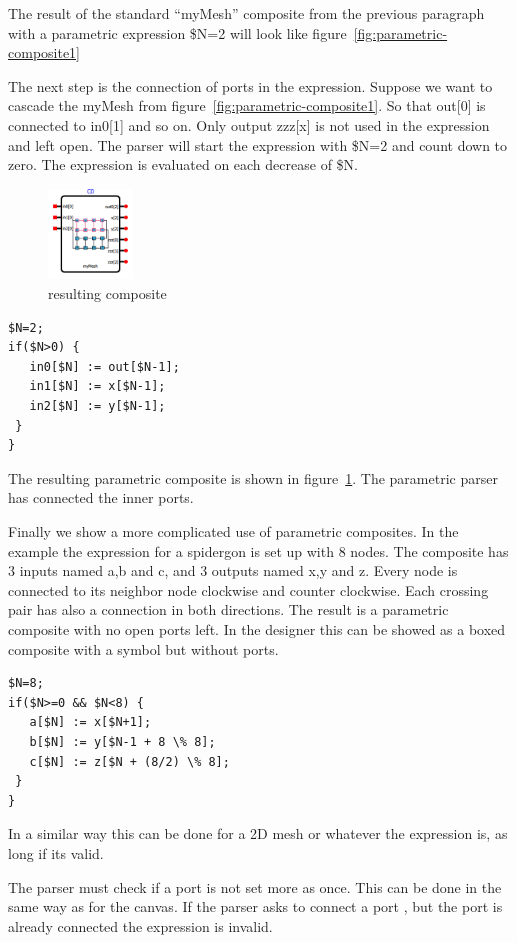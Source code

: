 The result of the standard ``myMesh'' composite from the previous paragraph with
a parametric expression \$N=2 will look like
figure~\ref{fig:parametric-composite1}

The next step is the connection of ports in the expression. Suppose we want to
cascade the myMesh from figure~\ref{fig:parametric-composite1}. So that out[0]
is connected to in0[1] and so on. Only output zzz[x] is not used in the
expression and left open. The parser will start the expression with \$N=2 and
count down to zero. The expression is evaluated on each decrease of \$N.

\begin{figure}
  \vspace{-20pt}
  \begin{center}
    \includegraphics[width=0.20\textwidth]{pictures/parametric-composite2}
  \caption{resulting composite}
  \label{fig:parametric-composite2}
  \end{center}
  \vspace{-30pt}
\end{figure}

\begin{lstlisting}
$N=2;
if($N>0) {
   in0[$N] := out[$N-1];
   in1[$N] := x[$N-1];
   in2[$N] := y[$N-1];
 }
}
\end{lstlisting}


The resulting parametric composite is shown in
figure~\ref{fig:parametric-composite2}. The parametric parser has connected the
inner ports.

Finally we show a more complicated use of parametric composites. In the example
the expression for a spidergon is set up with 8 nodes. The composite has 3
inputs named a,b and c, and 3 outputs named x,y and z. Every node is connected
to its neighbor node clockwise and counter clockwise. Each crossing pair has
also a connection in both directions. The result is a parametric composite with
no open ports left. In the designer this can be showed as a boxed composite with
a symbol but without ports.

\begin{lstlisting}
$N=8;
if($N>=0 && $N<8) {
   a[$N] := x[$N+1]; 
   b[$N] := y[$N-1 + 8 \% 8];
   c[$N] := z[$N + (8/2) \% 8];
 }
}
\end{lstlisting}

In a similar way this can be done for a 2D mesh or whatever the expression is,
as long if its valid.

The parser must check if a port is not set more as once. This can be done in the
same way as for the canvas. If the parser asks to connect a port , but the port
is already connected the expression is invalid.



\newpage
